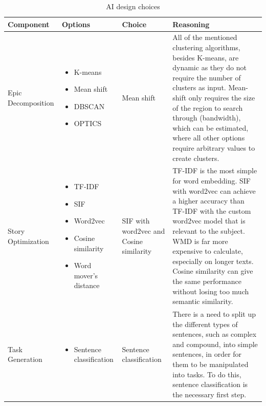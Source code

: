 \begin{table}[!h]
	\caption{AI design choices}
	\label{table:ai}
	\begin{tabularx}{\textwidth}{|p{3cm}|p{3cm}|p{2cm}|X|}
	\hline
	Component & Options & Choice & Reasoning\\
	\hline
	Epic Decomposition & 
		\begin{itemize}
		\item K-means
		\item Mean shift
		\item DBSCAN
		\item OPTICS
		\end{itemize} &
	Mean shift & All of the mentioned clustering algorithms, besides K-means, are dynamic as they do not require the number of clusters as input. Mean-shift only requires the size of the region to search through (bandwidth), which can be estimated, where all other options require arbitrary values to create clusters.\\
	\hline
	Story Optimization & 
		\begin{itemize}
		\item TF-IDF
		\item SIF
		\item Word2vec
		\item Cosine similarity
		\item Word mover's distance
		\end{itemize} &
	\begin{flushleft}
	SIF with word2vec and Cosine similarity
	\end{flushleft} & TF-IDF is the most simple for word embedding. SIF with word2vec can achieve a higher accuracy than TF-IDF with the custom word2vec model that is relevant to the subject. WMD is far more expensive to calculate, especially on longer texts. Cosine similarity can give the same performance without losing too much semantic similarity.\\
	\hline	
	Task Generation & 	
		\begin{itemize}
		\item Sentence classification
		\end{itemize}
	& Sentence classification & There is a need to split up the different types of sentences, such as complex and compound, into simple sentences, in order for them to be manipulated into tasks. To do this, sentence classification is the necessary first step.\\
	\hline	
	\end{tabularx}
\end{table}

